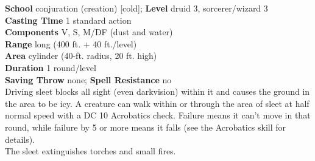 \textbf{School} conjuration (creation) [cold]; \textbf{Level} druid 3, sorcerer/wizard 3\\
\textbf{Casting Time} 1 standard action\\
\textbf{Components} V, S, M/DF (dust and water)\\
\textbf{Range} long (400 ft. + 40 ft./level)\\
\textbf{Area} cylinder (40-ft. radius, 20 ft. high)\\
\textbf{Duration} 1 round/level\\
\textbf{Saving Throw} none; \textbf{Spell Resistance} no\\
Driving sleet blocks all sight (even darkvision) within it and causes the ground in the area to be icy. A creature can walk within or through the area of sleet at half normal speed with a DC 10 Acrobatics check. Failure means it can't move in that round, while failure by 5 or more means it falls (see the Acrobatics skill for details).\\
The sleet extinguishes torches and small fires.\\
